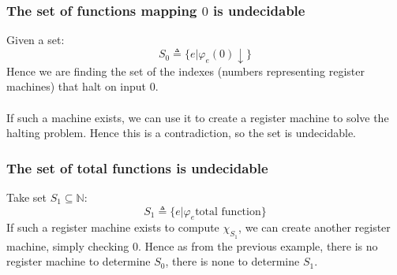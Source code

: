 \documentclass{report}
\begin{document}
\subsubsection*{The set of functions mapping $0$ is undecidable}
Given a set:
\[S_0 \triangleq \{e | \varphi_e(0)\downarrow\}\]
Hence we are finding the set of the indexes (numbers representing register machines) that halt on input $0$.
\\
\\ If such a machine exists, we can use it to create a register machine to solve the halting problem. Hence this is a contradiction, so the set is undecidable.

\subsubsection*{The set of total functions is undecidable}
Take set $S_1 \subseteq \mathbb{N}$:
\[S_1 \triangleq \{e | \varphi_e\text{total function}\}\]
If such a register machine exists to compute $\chi_{S_1}$, we can create another register machine, simply checking $0$. Hence as from the previous example, there is no register machine to determine $S_0$, there is none to determine $S_1$.
\end{document}
